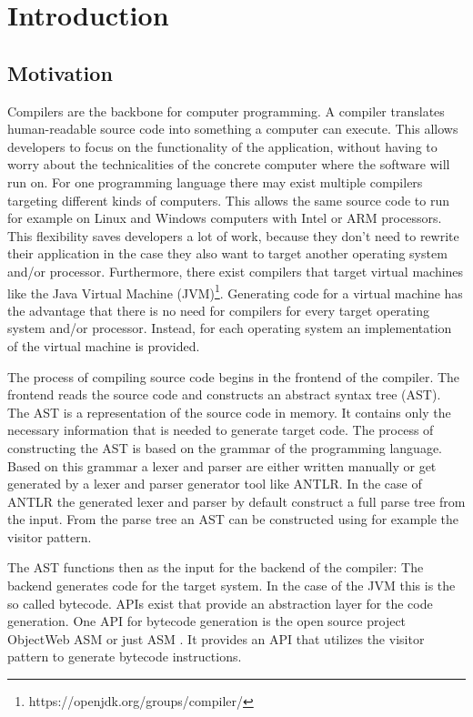 \chapter{Introduction}
\label{cha:introduction}

\section{Motivation}

Compilers are the backbone for computer programming. A compiler translates human-readable source code into something a computer can execute. This allows developers to focus on the functionality of the application, without having to worry about the technicalities of the concrete computer where the software will run on. For one programming language there may exist multiple compilers targeting different kinds of computers. This allows the same source code to run for example on Linux and Windows computers with Intel or ARM processors. This flexibility saves developers a lot of work, because they don't need to rewrite their application in the case they also want to target another operating system and/or processor. Furthermore, there exist compilers that target virtual machines like the Java Virtual Machine (JVM)\footnote{https://openjdk.org/groups/compiler/}. Generating code for a virtual machine has the advantage that there is no need for compilers for every target operating system and/or processor. Instead, for each operating system an implementation of the virtual machine is provided.

The process of compiling source code begins in the frontend of the compiler. The frontend reads the source code and constructs an abstract syntax tree (AST). The AST is a representation of the source code in memory. It contains only the necessary information that is needed to generate target code. The process of constructing the AST is based on the grammar of the programming language. Based on this grammar a lexer and parser are either written manually or get generated by a lexer and parser generator tool like ANTLR. In the case of ANTLR the generated lexer and parser by default construct a full parse tree from the input. From the parse tree an AST can be constructed using for example the visitor pattern. 

The AST functions then as the input for the backend of the compiler: The backend generates code for the target system. In the case of the JVM this is the so called bytecode.  APIs exist that provide an abstraction layer for the code generation. One API for bytecode generation is the open source project ObjectWeb ASM or just ASM \parencite{bruneton2007asm}. It provides an API that utilizes the visitor pattern to generate bytecode instructions. 


